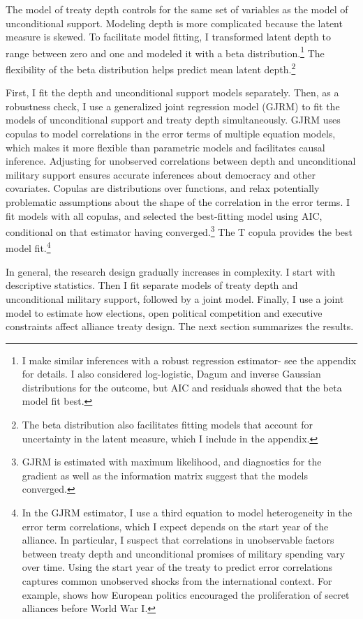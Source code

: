 \documentclass[12pt]{article}
\begin{document}
The model of treaty depth controls for the same set of variables as the model of unconditional support.  
Modeling depth is more complicated because the latent measure is skewed.
To facilitate model fitting, I transformed latent depth to range between zero and one and modeled it with a beta distribution.\footnote{I make similar inferences with a robust regression estimator- see the appendix for details. I also considered log-logistic, Dagum and inverse Gaussian distributions for the outcome, but AIC and residuals showed that the beta model fit best.}
The flexibility of the beta distribution helps predict mean latent depth.\footnote{The beta distribution also facilitates fitting models that account for uncertainty in the latent measure, which I include in the appendix.} 


First, I fit the depth and unconditional support models separately.
Then, as a robustness check, I use a generalized joint regression model (GJRM) \citep{Braumoelleretal2018} to fit the models of unconditional support and treaty depth simultaneously.
GJRM uses copulas to model correlations in the error terms of multiple equation models, which makes it more flexible than parametric models and facilitates causal inference. 
Adjusting for unobserved correlations between depth and unconditional military support ensures accurate inferences about democracy and other covariates. 
Copulas are distributions over functions, and relax potentially problematic assumptions about the shape of the correlation in the error terms. 
I fit models with all copulas, and selected the best-fitting model using AIC, conditional on that estimator having converged.\footnote{GJRM is estimated with maximum likelihood, and diagnostics for the gradient as well as the information matrix suggest that the models converged.} 
The T copula provides the best model fit.\footnote{In the GJRM estimator, I use a third equation to model heterogeneity in the error term correlations, which I expect depends on the start year of the alliance. 
In particular, I suspect that correlations in unobservable factors between treaty depth and unconditional promises of military spending vary over time. 
Using the start year of the treaty to predict error correlations captures common unobserved shocks from the international context. 
For example, \citet{Kuo2019} shows how European politics encouraged the proliferation of secret alliances before World War I.}


In general, the research design gradually increases in complexity. 
I start with descriptive statistics. 
Then I fit separate models of treaty depth and unconditional military support, followed by a joint model. 
Finally, I use a joint model to estimate how elections, open political competition and executive constraints affect alliance treaty design. 
The next section summarizes the results. 
\end{document}

